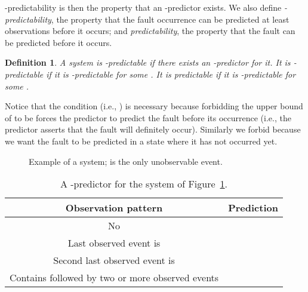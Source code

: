\documentclass{article}
\newtheorem{defi}{Definition}
\newcommand{\path}[0]{\mathit{\rho}}
\begin{document}
-predictability is then the property 
that an -predictor exists.  
We also define \emph{-predictability}, 
the property that the fault occurrence can be predicted 
at least  observations before it occurs; 
and \emph{predictability}, 
the property that the fault can be predicted before it occurs.  

\begin{defi}\label{defi::predictability}
  A system is \emph{-predictable} 
  if there exists an -predictor for it.  
  It is \emph{-predictable} if it is -predictable 
  for some .  
  It is \emph{predictable} if it is -predictable 
  for some .  
\end{defi}

Notice that the condition  (i.e., ) 
is necessary because forbidding the upper bound of  
to be  forces the predictor 
to predict the fault before its occurrence 
(i.e., the predictor asserts that the fault will definitely occur).  
Similarly we forbid  because we want the fault to be predicted 
in a state where it has not occurred yet.  

\begin{figure}[ht]
  \begin{center}
  \end{center}
  \caption{Example of a system;  is the only unobservable event.}
  \label{fig::simple}
\end{figure}

\begin{table}[ht]
  \begin{center}
    \begin{tabular}{c | c}
      Observation pattern & Prediction\\
      \hline
      No  & \\
      Last observed event is  & \\
      Second last observed event is  & \\
      Contains  followed by two or more observed events & 
    \end{tabular}
  \end{center}
  \caption{A -predictor for the system of Figure~\ref{fig::simple}.}
  \label{tab::predictor}
\end{table}
\end{document}
